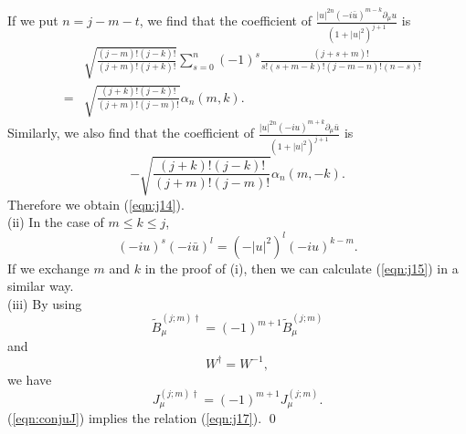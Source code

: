 \documentclass[makeidx,12pt,openany]{report}
\begin{document}
If we put $n=j-m-t$, we find that the coefficient of 
$\displaystyle{
 \frac{|u|^{2n} (-i\bar{u})^{m-k} \partial_{\mu}u}{(1+|u|^2)^{j+1}}}$ is 
\begin{eqnarray*}
&&\sqrt{\frac{(j-m)!(j-k)!}{(j+m)!(j+k)!}}\sum_{s=0}^n (-1)^s 
   \frac{(j+s+m)!}{s!(s+m-k)!(j-m-n)!(n-s)!} \\
&=& \sqrt{\frac{(j+k)!(j-k)!}{(j+m)!(j-m)!}}\alpha _n(m,k). 
\end{eqnarray*}
Similarly, we also find that the coefficient of 
$\displaystyle{
 \frac{|u|^{2n} (-iu)^{m+k} \partial_{\mu}\bar{u}}{(1+|u|^2)^{j+1}}}$ is 
$$
-\sqrt{\frac{(j+k)!(j-k)!}{(j+m)!(j-m)!}}\alpha _n(m,-k). 
$$
Therefore we obtain (\ref{eqn:j14}). \\
(ii) In the case of $m \le k \le j$, 
\begin{equation}
 (-iu)^s (-i\bar{u})^l=(-|u|^2)^l (-iu)^{k-m}. 
\end{equation}
If we exchange $m$ and $k$ in the proof of (i), then we can calculate 
(\ref{eqn:j15}) in a similar way. \\
(iii) By using 
\begin{equation}
 \tilde{B}_{\mu}^{(j;m) \dag}=(-1)^{m+1}\tilde{B}_{\mu}^{(j;m)}
\end{equation}
and 
\begin{equation}
 W^{\dag}=W^{-1}, 
\end{equation}
we have 
\begin{equation}
 J_{\mu}^{(j;m) \dag}=(-1)^{m+1}J_{\mu}^{(j;m)}. 
 \label{eqn:conjuJ}
\end{equation}
(\ref{eqn:conjuJ}) implies the relation (\ref{eqn:j17}). \qed 

\end{document}
